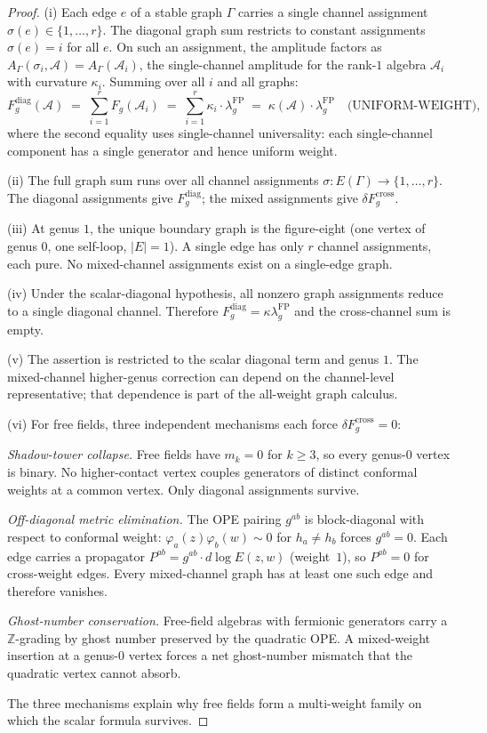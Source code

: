 \documentclass[11pt]{article}
\theoremstyle{definition}
\theoremstyle{remark}
\newcommand{\cA}{\mathcal{A}}
\newcommand{\FP}{\mathrm{FP}}
\newcommand{\diag}{\mathrm{diag}}
\newcommand{\cross}{\mathrm{cross}}
\numberwithin{equation}{section}
\begin{document}
\begin{proof}
(i) Each edge $e$ of a stable graph $\Gamma$ carries a single
channel assignment $\sigma(e) \in \{1, \ldots, r\}$.
The diagonal graph sum restricts to constant assignments
$\sigma(e) = i$ for all $e$.
On such an assignment, the amplitude factors as
$A_{\Gamma}(\sigma_i, \cA) = A_{\Gamma}(\cA_i)$,
the single-channel amplitude for the rank-$1$ algebra $\cA_i$
with curvature $\kappa_i$.
Summing over all $i$ and all graphs:
\[
 F_g^{\diag}(\cA)
 \;=\;
 \sum_{i=1}^r F_g(\cA_i)
 \;=\;
 \sum_{i=1}^r \kappa_i \cdot \lambda_g^{\FP}
 \;=\;
 \kappa(\cA) \cdot \lambda_g^{\FP}
 \quad\text{(UNIFORM-WEIGHT)},
\]
where the second equality uses single-channel universality:
each single-channel component has a single generator and
hence uniform weight.

\smallskip\noindent
(ii) The full graph sum runs over all channel assignments
$\sigma \colon E(\Gamma) \to \{1, \ldots, r\}$.
The diagonal assignments give $F_g^{\diag}$; the mixed
assignments give $\delta F_g^{\cross}$.

\smallskip\noindent
(iii) At genus $1$, the unique boundary graph is the
figure-eight (one vertex of genus $0$, one self-loop,
$|E| = 1$).
A single edge has only $r$ channel assignments, each pure.
No mixed-channel assignments exist on a single-edge graph.

\smallskip\noindent
(iv) Under the scalar-diagonal hypothesis, all nonzero graph
assignments reduce to a single diagonal channel. Therefore
\(F_g^{\diag}=\kappa\lambda_g^{\FP}\) and the cross-channel sum is
empty.

\smallskip\noindent
(v) The assertion is restricted to the scalar diagonal term and genus
\(1\). The mixed-channel higher-genus correction can depend on the
channel-level representative; that dependence is part of the
all-weight graph calculus.

\smallskip\noindent
(vi) For free fields, three independent mechanisms each
force $\delta F_g^{\cross} = 0$:

\emph{Shadow-tower collapse.}
Free fields have $m_k = 0$ for $k \geq 3$, so every
genus-$0$ vertex is binary.
No higher-contact vertex couples generators of distinct
conformal weights at a common vertex.
Only diagonal assignments survive.

\emph{Off-diagonal metric elimination.}
The OPE pairing $g^{ab}$ is block-diagonal with respect to
conformal weight: $\varphi_a(z)\varphi_b(w) \sim 0$ for
$h_a \neq h_b$ forces $g^{ab} = 0$.
Each edge carries a propagator
$P^{ab} = g^{ab} \cdot d\log E(z,w)$ (weight~$1$),
so $P^{ab} = 0$ for cross-weight edges.
Every mixed-channel graph has at least one such edge and
therefore vanishes.

\emph{Ghost-number conservation.}
Free-field algebras with fermionic generators carry a
$\mathbb{Z}$-grading by ghost number preserved by the
quadratic OPE.
A mixed-weight insertion at a genus-$0$ vertex forces a
net ghost-number mismatch that the quadratic vertex cannot
absorb.

The three mechanisms explain why free fields form a multi-weight
family on which the scalar formula survives.
\end{proof}
\end{document}
